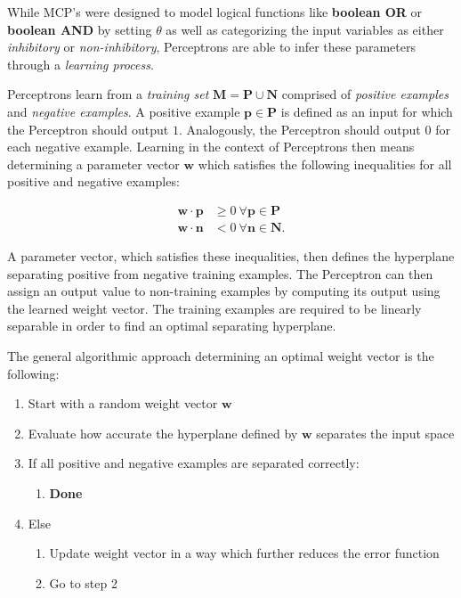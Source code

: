 While MCP's were designed to model logical functions like \textbf{boolean OR} or \textbf{boolean AND} by setting $\theta$ as well as categorizing the input variables as either \textit{inhibitory} or \textit{non-inhibitory}, Perceptrons are able to infer these parameters through a \textit{learning process}.

Perceptrons learn from a \textit{training set} $\bm{M} = \bm{P} \cup \bm{N}$ comprised of \textit{positive examples} and \textit{negative examples}.
A positive example $\bm{p} \in \bm{P}$ is defined as an input for which the Perceptron should output $1$.
Analogously, the Perceptron should output $0$ for each negative example.
Learning in the context of Perceptrons then means determining a parameter vector $\bm{w}$ which satisfies the following inequalities for all positive and negative examples:

\begin{equation}
    \begin{split}
        \bm{w} \cdot \bm{p} &\geq 0 ~ \forall \bm{p} \in \bm{P} \\
        \bm{w} \cdot \bm{n} &< 0 ~ \forall \bm{n} \in \bm{N}.
    \end{split}
\end{equation}

A parameter vector, which satisfies these inequalities, then defines the hyperplane separating positive from negative training examples.
The Perceptron can then assign an output value to non-training examples by computing its output using the learned weight vector.
The training examples are required to be linearly separable in order to find an optimal separating hyperplane.

The general algorithmic approach determining an optimal weight vector is the following:

\begin{enumerate}
    \item Start with a random weight vector $\bm{w}$
    \item Evaluate how accurate the hyperplane defined by $\bm{w}$ separates the input space
    \item If all positive and negative examples are separated correctly:
    \begin{enumerate}
        \item \textbf{Done}
    \end{enumerate}
    \item Else
    \begin{enumerate}
        \item Update weight vector in a way which further reduces the error function
        \item Go to step 2
    \end{enumerate}
\end{enumerate}

